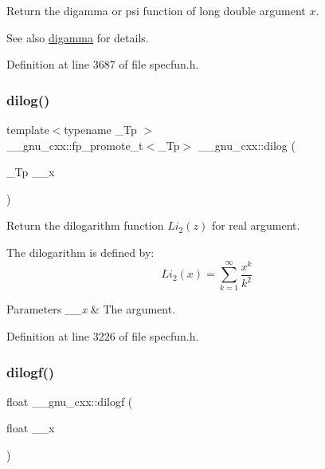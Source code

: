 Return the digamma or psi function of {\ttfamily long double} argument $ x $.

\begin{DoxySeeAlso}{See also}
\hyperlink{group__gnu__math__spec__func_ga7b87300edf8754d959e1d94fe0c9246e}{digamma} for details. 
\end{DoxySeeAlso}


Definition at line 3687 of file specfun.\+h.

\mbox{\label{group__gnu__math__spec__func_ga4185ee1a0f9189a18085f65d52b6bc9b}} 
\subsubsection{\texorpdfstring{dilog()}{dilog()}}
{\footnotesize\ttfamily template$<$typename \+\_\+\+Tp $>$ \\
\+\_\+\+\_\+gnu\+\_\+cxx\+::fp\+\_\+promote\+\_\+t$<$\+\_\+\+Tp$>$ \+\_\+\+\_\+gnu\+\_\+cxx\+::dilog (\begin{DoxyParamCaption}\item[{\+\_\+\+Tp}]{\+\_\+\+\_\+x }\end{DoxyParamCaption})\hspace{0.3cm}{\ttfamily [inline]}}

Return the dilogarithm function $ Li_2(z) $ for real argument.

The dilogarithm is defined by\+: \[ Li_2(x) = \sum_{k=1}^{\infty}\frac{x^k}{k^2} \]


\begin{DoxyParams}{Parameters}
{\em \+\_\+\+\_\+x} & The argument. \\
\hline
\end{DoxyParams}


Definition at line 3226 of file specfun.\+h.

\mbox{\label{group__gnu__math__spec__func_ga901091e0e7ce7d6113ae6a86f4865a92}} 
\subsubsection{\texorpdfstring{dilogf()}{dilogf()}}
{\footnotesize\ttfamily float \+\_\+\+\_\+gnu\+\_\+cxx\+::dilogf (\begin{DoxyParamCaption}\item[{float}]{\+\_\+\+\_\+x }\end{DoxyParamCaption})\hspace{0.3cm}{\ttfamily [inline]}}

